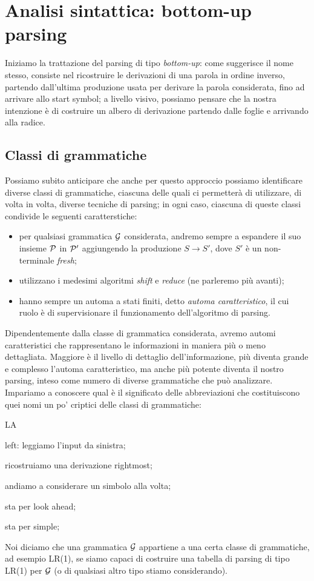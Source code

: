 \documentclass[class=book, crop=false, oneside, 12pt]{standalone}
\begin{document}
\chapter{Analisi sintattica: bottom-up parsing}
Iniziamo la trattazione del parsing di tipo \emph{bottom-up}: come suggerisce il nome stesso, consiste nel ricostruire le derivazioni di una parola in ordine inverso, partendo dall'ultima produzione usata per derivare la parola considerata, fino ad arrivare allo start symbol; a livello visivo, possiamo pensare che la nostra intenzione è di costruire un albero di derivazione partendo dalle foglie e arrivando alla radice.

\section{Classi di grammatiche}
Possiamo subito anticipare che anche per questo approccio possiamo identificare diverse classi di grammatiche, ciascuna delle quali ci permetterà di utilizzare, di volta in volta, diverse tecniche di parsing; in ogni caso, ciascuna di queste classi condivide le seguenti caratterstiche:
\begin{itemize}
    \item per qualsiasi grammatica \(\G\) considerata, andremo sempre a espandere il suo insieme \(\P\) in \(\P'\) aggiungendo la produzione \(S \to S'\), dove \(S'\) è un non-terminale \emph{fresh};
    \item utilizzano i medesimi algoritmi \emph{shift} e \emph{reduce} (ne parleremo più avanti);
    \item hanno sempre un automa a stati finiti, detto \emph{automa caratteristico}, il cui ruolo è di supervisionare il funzionamento dell'algoritmo di parsing.
\end{itemize}
Dipendentemente dalla classe di grammatica considerata, avremo automi caratteristici che rappresentano le informazioni in maniera più o meno dettagliata. Maggiore è il livello di dettaglio dell'informazione, più diventa grande e complesso l'automa caratteristico, ma anche più potente diventa il nostro parsing, inteso come numero di diverse grammatiche che può analizzare. Impariamo a conoscere qual è il significato delle abbreviazioni che costituiscono quei nomi un po' criptici delle classi di grammatiche:
\begin{labeling}{LA}
    \item[L] left: leggiamo l'input da sinistra;
    \item[R] ricostruiamo una derivazione rightmost;
    \item[1] andiamo a considerare un simbolo alla volta;
    \item[LA] sta per look ahead;
    \item[S] sta per simple;  
\end{labeling}
Noi diciamo che una grammatica \(\G\) appartiene a una certa classe di grammatiche, ad esempio LR(1), se siamo capaci di costruire una tabella di parsing di tipo LR(1) per \(\G\) (o di qualsiasi altro tipo stiamo considerando).
\end{document}
